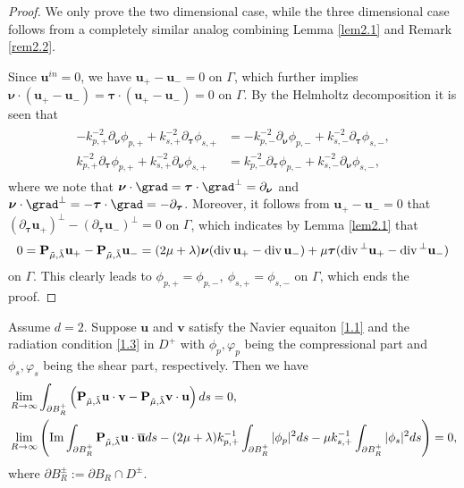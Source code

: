 \documentclass[final,reqno]{siamltex}
\newcommand{\pa}{\partial}
\newcommand{\ov}{\overline}
\newcommand{\I}{{\rm Im}}
\newcommand{\dive}{{\rm div\,}}
\begin{document}
\begin{proof}
	We only prove the two dimensional case, while the three dimensional case follows from a completely similar analog combining Lemma \ref{lem2.1} and Remark \ref{rem2.2}. 
	
	Since $\mathbf{u}^{in}=0$, we have $\mathbf{u}_+-\mathbf{u}_-=0$ on $\Gamma$, which further implies $\boldsymbol{\nu}\cdot(\mathbf{u}_+-\mathbf{u}_-)=\boldsymbol{\tau}\cdot(\mathbf{u}_+-\mathbf{u}_-)=0$ on $\Gamma$. By the Helmholtz decomposition it is seen that 
	\begin{align*}
	  \begin{aligned}
	  -k_{p,+}^{-2}\pa_{\boldsymbol{\nu}}\phi_{p,+}+k_{s,+}^{-2}\pa_{\boldsymbol{\tau}}\phi_{s,+}&=-k_{p,-}^{-2}\pa_{\boldsymbol{\nu}}\phi_{p,-}+k_{s,-}^{-2}\pa_{\boldsymbol{\tau}}\phi_{s,-}, \\
	  k_{p,+}^{-2}\pa_{\boldsymbol{\tau}}\phi_{p,+}+k_{s,+}^{-2}\pa_{\boldsymbol{\nu}}\phi_{s,+}&=k_{p,-}^{-2}\pa_{\boldsymbol{\tau}}\phi_{p,-}+k_{s,-}^{-2}\pa_{\boldsymbol{\nu}}\phi_{s,-}, 
	  \end{aligned}
	\end{align*}
	where we note that $\boldsymbol{\nu}\cdot\grad=\boldsymbol{\tau}\cdot\grad^\perp=\pa_{\boldsymbol{\nu}}$ and $\boldsymbol{\nu}\cdot\grad^\perp=-\boldsymbol{\tau}\cdot\grad=-\pa_{\boldsymbol{\tau}}$. Moreover, it follows from $\mathbf{u}_+-\mathbf{u}_-=0$ that $(\pa_{\boldsymbol{\tau}}\mathbf{u}_+)^\perp-(\pa_{\boldsymbol{\tau}}\mathbf{u}_-)^\perp=0$ on $\Gamma$, which indicates by Lemma \ref{lem2.1} that 
	$$
	  0=\mathbf{P}_{\tilde\mu,\tilde\lambda}\mathbf{u}_+-\mathbf{P}_{\tilde\mu,\tilde\lambda}\mathbf{u}_-=(2\mu+\lambda)\boldsymbol{\nu}(\dive\mathbf{u}_+-\dive\mathbf{u}_-)+\mu\boldsymbol{\tau}(\dive^\perp\mathbf{u}_+-\dive^\perp\mathbf{u}_-)
	$$
	on $\Gamma$. This clearly leads to $\phi_{p,+}=\phi_{p,-},~\phi_{s,+}=\phi_{s,-}$ on $\Gamma$, which ends the proof. 
\end{proof}
\begin{theorem}\label{thm2.4a}
	Assume $d=2$. Suppose $\mathbf{u}$ and $\mathbf{v}$ satisfy the Navier equaiton \eqref{1.1} and the radiation condition \eqref{1.3} in $D^+$ with $\phi_p,\varphi_p$ being the compressional part and $\phi_s,\varphi_s$ being the shear part, respectively. Then we have 
	\begin{align*}
	  &\lim\limits_{R\rightarrow\infty}\int_{\pa B_R^+}\left(\mathbf{P}_{\tilde{\mu},\tilde{\lambda}}\mathbf{u}\cdot\mathbf{v}-\mathbf{P}_{\tilde{\mu},\tilde{\lambda}}\mathbf{v}\cdot\mathbf{u}\right)ds=0, \\
	  &\lim\limits_{R\rightarrow\infty}\left(\I\int_{\pa B_R^+}\mathbf{P}_{\tilde{\mu},\tilde{\lambda}}\mathbf{u}\cdot\mathbf{\ov u}ds-(2\mu+\lambda)k_{p,+}^{-1}\int_{\pa B_R^+}|\phi_p|^2ds-\mu k_{s,+}^{-1}\int_{\pa B_R^+}|\phi_s|^2ds\right)=0, 
	\end{align*}
	where $\pa B_R^\pm:=\pa B_R\cap D^\pm$. 
\end{theorem}
\end{document}
